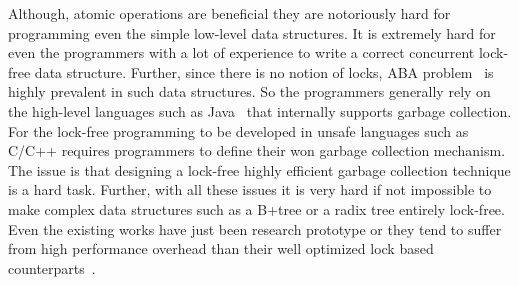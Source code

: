 Although, atomic operations are beneficial they are notoriously hard for
programming even the simple low-level data structures. It is extremely hard for
even the programmers with a lot of  experience to write a correct concurrent
lock-free data structure. Further, since there is no notion of locks, ABA
problem~\cite{} is highly prevalent in such data structures. So the programmers
generally rely on the high-level languages such as Java~\cite{} that internally
supports garbage collection. For the lock-free programming to be developed in
unsafe languages such as C/C++ requires programmers to define their won garbage
collection mechanism. The issue is that designing a lock-free highly efficient
garbage collection technique is a hard task. Further, with all these issues it
is very hard if not impossible to make complex data structures such as a B+tree
or a radix tree entirely lock-free. Even the existing works have just been
research prototype or they tend to suffer from high performance overhead than
their well optimized lock based counterparts~\cite{}.
























